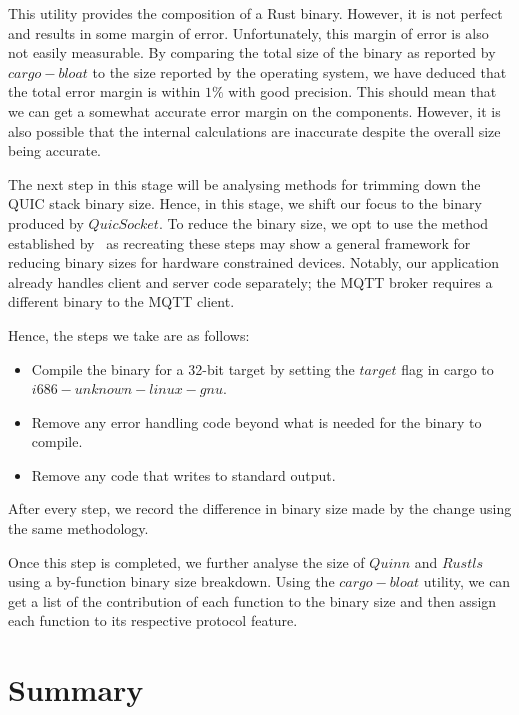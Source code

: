This utility provides the composition of a Rust binary. 
However, it is not perfect and results in some margin of error.
Unfortunately, this margin of error is also not easily measurable.
By comparing the total size of the binary as reported by $cargo-bloat$ to the size reported by the operating system, we have deduced that the total error margin is within $1\%$ with good precision.
This should mean that we can get a somewhat accurate error margin on the components. 
However, it is also possible that the internal calculations are inaccurate despite the overall size being accurate.

The next step in this stage will be analysing methods for trimming down the QUIC stack binary size.
Hence, in this stage, we shift our focus to the binary produced by $QuicSocket$.
To reduce the binary size, we opt to use the method established by~\citet{eggert_towards_2020} as recreating these steps may show a general framework for reducing binary sizes for hardware constrained devices.
Notably, our application already handles client and server code separately; the MQTT broker requires a different binary to the MQTT client.

Hence, the steps we take are as follows:

\begin{itemize}
    \item Compile the binary for a 32-bit target by setting the $target$ flag in cargo to $i686-unknown-linux-gnu$.
    \item Remove any error handling code beyond what is needed for the binary to compile.
    \item Remove any code that writes to standard output.
\end{itemize}

After every step, we record the difference in binary size made by the change using the same methodology.

Once this step is completed, we further analyse the size of $Quinn$ and $Rustls$ using a by-function binary size breakdown.
Using the $cargo-bloat$ utility, we can get a list of the contribution of each function to the binary size and then assign each function to its respective protocol feature.



\section{Summary}

